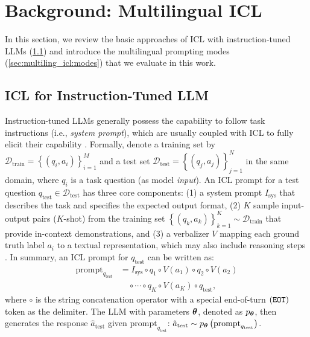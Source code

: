 \section{Background: Multilingual ICL}
\label{sec:multiling_icl}
In this section, we review the basic approaches of ICL with instruction-tuned LLMs (\cref{sec:multiling_icl:icl_instruction_tuning}) and introduce the multilingual prompting modes (\cref{sec:multiling_icl:modes}) that we evaluate in this work.
\subsection{ICL for Instruction-Tuned LLM} \label{sec:multiling_icl:icl_instruction_tuning}
Instruction-tuned LLMs \citep{instructGPT,cross_task_generalization, super_natural_instructions, ft_lm_are_zs_learners} generally possess the capability to follow task instructions (i.e., \textit{system prompt}), which are usually coupled with ICL to fully elicit their capability .
Formally, denote a training set by $\mathcal{D}_\text{train}=\left\{\left(q_i, a_i\right)\right\}_{i=1}^M$ and a test set $\mathcal{D}_\text{test}=\left\{\left(q_j, a_j\right)\right\}_{j=1}^{N}$ in the same domain, where $q_i$ is a task question (as model \textit{input}).
An ICL prompt for a test question $q_{\text{test}} \in \mathcal{D}_\text{test}$ has three core components:
(1) a system prompt $I_\text{sys}$ that describes the task and specifies the expected output format,
(2) $K$ sample input-output pairs ($K$-shot) from the training set $\left\{\left(q_k, a_k\right)\right\}_{k=1}^K \sim \mathcal{D}_\text{train}$ that provide in-context demonstrations, and
(3) a verbalizer $V$ mapping each ground truth label $a_i$ to a textual representation, which may also include reasoning steps \citep[i.e., chains of thoughts, or CoT in short;][]{cot}.
In summary, an ICL prompt for $q_{\text{test}}$ can be written as:
\begin{align}
  \text{prompt}_{q_\text{test}} & = I_\text{sys} \circ q_1 \circ V\left(a_1\right) \circ q_2 \circ V\left(a_2\right) \nonumber \\
                                & \quad \circ \cdots \circ q_K \circ V\left(a_K\right) \circ q_{\text{test}},
  \label{eq:icl_construction}
\end{align}
where $\circ$ is the string concatenation operator with a special end-of-turn $\left(\operatorname{\texttt{EOT}}\right)$ token as the delimiter.
The LLM with parameters $\boldsymbol{\mathbf{\theta}}$, denoted as $p_{\boldsymbol{\mathbf{\theta}}}$, then generates the response $\hat{a}_\text{test}$ given $\text{prompt}_{q_\text{test}}$:
$\hat{a}_\text{test} \sim p_{\boldsymbol{\mathbf{\theta}}}\left(\text{prompt}_{q_\text{test}}\right)$.


